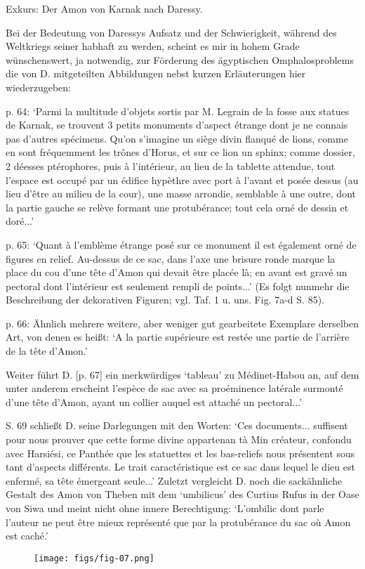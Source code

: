 \documentclass[a4paper, 11pt, oneside]{article}
\begin{document}
Exkurs: Der Amon von Karnak nach Daressy.

Bei der Bedeutung von Daressys Aufsatz und der Schwierigkeit, während des Weltkriegs seiner habhaft zu werden, scheint es mir in hohem Grade wünschenswert, ja notwendig, zur Förderung des ägyptischen Omphalosproblems die von D. mitgeteilten Abbildungen nebst kurzen Erläuterungen hier wiederzugeben:

p. 64: `Parmi la multitude d'objets sortis par M. Legrain de la fosse aux statues de Karnak, se trouvent 3 petits monuments d'aspect étrange dont je ne connais pas d'autres spécimens. Qu'on s'imagine un siège divin flanqué de lions, comme en sont fréquemment les trônes d'Horus, et sur ce lion un sphinx; comme dossier, 2 déesses ptérophores, puis à l'intérieur, au lieu de la tablette attendue, tout l'espace est occupé par un édifice hypèthre avec port à l'avant et posée dessus (au lieu d'être au milieu de la cour), une masse arrondie, semblable à une outre, dont la partie gauche se relève formant une protubérance; tout cela orné de dessin et doré...'

p. 65: `Quant à l'emblème étrange posé sur ce monument il est également orné de figures en relief. Au-dessus de ce sac, dans l'axe une brisure ronde marque la place du cou d'une tête d'Amon qui devait être placée là; en avant est gravé un pectoral dont l'intérieur est seulement rempli de points...' (Es folgt nunmehr die Beschreibung der dekorativen Figuren; vgl. Taf. 1 u. uns. Fig. 7a-d S. 85).

p. 66: Ähnlich mehrere weitere, aber weniger gut gearbeitete Exemplare derselben Art, von denen es heißt: `A la partie supérieure est restée une partie de l'arrière de la tête d'Amon.'

Weiter führt D. [p. 67] ein merkwürdiges `tableau' zu Médinet-Habou an, auf dem unter anderem erscheint l'espèce de sac avec sa proéminence latérale surmonté d'une tête d'Amon, ayant un collier auquel est attaché un pectoral...'

S. 69 schließt D. seine Darlegungen mit den Worten: `Ces documents... suffisent pour nous prouver que cette forme divine appartenan tà Min créateur, confondu avec Harsiési, ce Panthée que les statuettes et les bas-reliefs nous présentent sous tant d'aspects différents. Le trait caractéristique est ce sac dans lequel le dieu est enfermé, sa tête émergeant seule...' Zuletzt vergleicht D. noch die sackähnliche Gestalt des Amon von Theben mit dem `umbilicus' des Curtius Rufus in der Oase von Siwa und meint nicht ohne innere Berechtigung: `L'ombilic dont parle l'auteur ne peut être mieux représenté que par la protubérance du sac où Amon est caché.'
\clearpage
\vspace*{\fill}
\begin{figure}[H]
\centering
\texttt{[image: figs/fig-07.png]}
\caption{}
\end{figure}
\vspace*{\fill}
\clearpage
\end{document}
